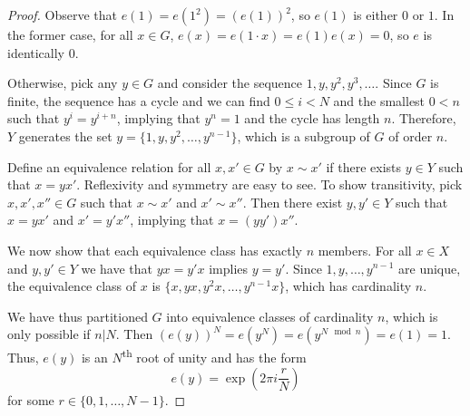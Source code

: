 \documentclass[oneside]{article}
\begin{document}
  \begin{proof}
    Observe that $e(1) = e(1^2) = (e(1))^2$, so $e(1)$ is either $0$ or $1$. In the former case, for all $x \in G$, $e(x) = e(1 \cdot x) = e(1)e(x) = 0$, so $e$ is identically $0$.

    Otherwise, pick any $y \in G$ and consider the sequence $1, y, y^2, y^3, \dots$. Since $G$ is finite, the sequence has a cycle and we can find $0 \leq i < N$ and the smallest $0 < n$ such that $y^i = y^{i+n}$, implying that $y^n = 1$ and the cycle has length $n$. Therefore, $Y$ generates the set $y = \{1, y, y^2, \dots, y^{n-1}\}$, which is a subgroup of $G$ of order $n$.

    Define an equivalence relation for all $x, x' \in G$ by $x \sim x'$ if there exists $y \in Y$ such that $x = yx'$. Reflexivity and symmetry are easy to see. To show transitivity, pick $x, x', x'' \in G$ such that $x \sim x'$ and $x' \sim x''$. Then there exist $y, y' \in Y$ such that $x = yx'$ and $x' = y'x''$, implying that $x=(yy')x''$.

    We now show that each equivalence class has exactly $n$ members. For all $x \in X$ and $y, y' \in Y$ we have that $yx = y'x$ implies $y = y'$. Since $1, y, \dots, y^{n-1}$ are unique, the equivalence class of $x$ is $\{x, yx, y^2x, \dots, y^{n-1}x\}$, which has cardinality $n$.

    We have thus partitioned $G$ into equivalence classes of cardinality $n$, which is only possible if $n|N$. Then $(e(y))^N = e(y^N) = e(y^{N \mod n}) = e(1) = 1$. Thus, $e(y)$ is an $N$\textsuperscript{th} root of unity and has the form \[
      e(y) = \exp\left(2\pi i \frac{r}{N}\right)
    \] for some $r \in \{0, 1, \dots, N-1\}$.\end{proof}
\end{document}
